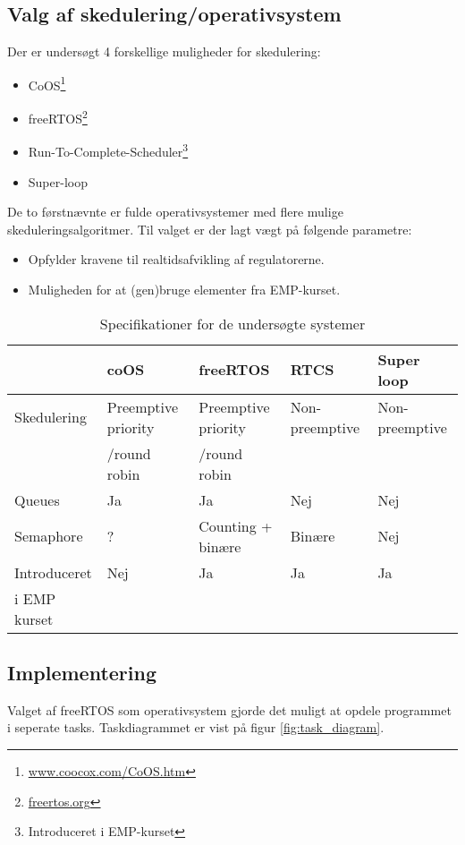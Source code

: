 
\subsection{Valg af skedulering/operativsystem}
Der er undersøgt 4 forskellige muligheder for skedulering: 

\begin{itemize}
\itemsep1pt
	\item CoOS\footnote{\url{www.coocox.com/CoOS.htm}} 
	\item freeRTOS\footnote{\url{freertos.org}}
	\item Run-To-Complete-Scheduler\footnote{Introduceret i EMP-kurset}
	\item Super-loop
\end{itemize}

De to førstnævnte er fulde operativsystemer med flere mulige skeduleringsalgoritmer. 
Til valget er der lagt vægt på følgende parametre: 

\begin{itemize}
\itemsep1pt
	\item Opfylder kravene til realtidsafvikling af regulatorerne. 
	\item Muligheden for at (gen)bruge elementer fra EMP-kurset.
\end{itemize}

\begin{table}[h!]
\begin{tabular}{|l|l|l|l|l|}
\hline 
 & coOS & freeRTOS & RTCS & Super loop \\ 
\hline 
Skedulering & Preemptive priority  & Preemptive priority  & Non-preemptive & Non-preemptive  \\ 
			& /round robin		&	/round robin & &	\\
\hline 
Queues & Ja & Ja & Nej & Nej \\ 
\hline 
Semaphore & ?  & Counting + binære & Binære  & Nej  \\ 
\hline 
Introduceret & Nej & Ja & Ja & Ja \\ 
i EMP kurset &   &   &   &   \\
\hline 
\end{tabular} 
\caption{Specifikationer for de undersøgte systemer}
\label{tb:os_comparison}
\end{table}
%
\subsection{Implementering}
% 
% 
Valget af freeRTOS som operativsystem gjorde det muligt at opdele programmet i seperate tasks. Taskdiagrammet er vist på figur \ref{fig:task_diagram}. 

